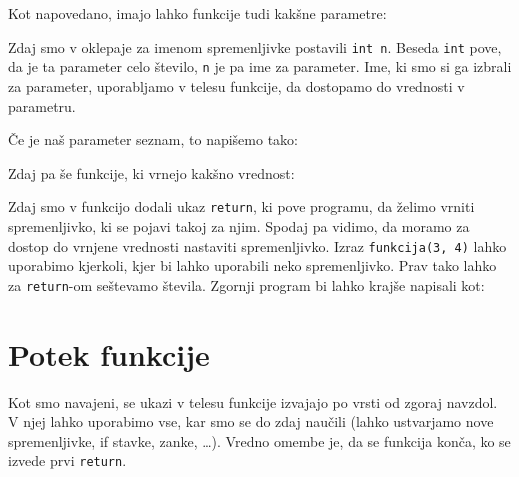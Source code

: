 Kot napovedano, imajo lahko funkcije tudi kakšne parametre:

\begin{examples}
\end{examples}

Zdaj smo v oklepaje za imenom spremenljivke postavili \verb+int n+. Beseda
\verb+int+ pove, da je ta parameter celo število, \verb+n+ je pa ime za
parameter. Ime, ki smo si ga izbrali za parameter, uporabljamo v telesu
funkcije, da dostopamo do vrednosti v parametru.

Če je naš parameter seznam, to napišemo tako:

\begin{examples}
\end{examples}

Zdaj pa še funkcije, ki vrnejo kakšno vrednost:

\begin{examples}
\end{examples}

Zdaj smo v funkcijo dodali ukaz \verb+return+, ki pove programu, da želimo
vrniti spremenljivko, ki se pojavi takoj za njim. Spodaj pa vidimo, da moramo
za dostop do vrnjene vrednosti nastaviti spremenljivko. Izraz
\verb+funkcija(3, 4)+ lahko uporabimo kjerkoli, kjer bi lahko uporabili neko
spremenljivko. Prav tako lahko za \verb+return+-om seštevamo števila. Zgornji
program bi lahko krajše napisali kot:

\begin{examples}
\end{examples}


\section{Potek funkcije}

Kot smo navajeni, se ukazi v telesu funkcije izvajajo po vrsti od zgoraj
navzdol. V njej lahko uporabimo vse, kar smo se do zdaj naučili (lahko
ustvarjamo nove spremenljivke, if stavke, zanke, \ldots ). Vredno omembe je, da
se funkcija konča, ko se izvede prvi \verb+return+.

\begin{examples}
\end{examples}

